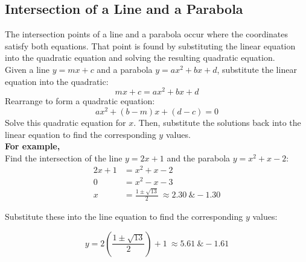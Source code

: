 \documentclass[12pt]{article}
\begin{document}
\begin{center}
\end{center}

\subsection*{Intersection of a Line and a Parabola}
The intersection points of a line and a parabola occur where the coordinates satisfy both equations. That point is found by substituting the linear equation into the quadratic equation and solving the resulting quadratic equation.\\

Given a line \( y = mx + c \) and a parabola \( y = ax^2 + bx + d \), substitute the linear equation into the quadratic:
\[
mx + c = ax^2 + bx + d
\]
Rearrange to form a quadratic equation:
\[
ax^2 + (b-m)x + (d-c) = 0
\]
Solve this quadratic equation for \(x\). Then, substitute the solutions back into the linear equation to find the corresponding \(y\) values.\\

\textbf{For example,}\\

Find the intersection of the line \( y = 2x + 1 \) and the parabola \( y = x^2 + x - 2 \):
\[
\begin{aligned}
2x + 1 &= x^2 + x - 2 \\
0 &= x^2 - x - 3 \\
x &= \frac{1 \pm \sqrt{13}}{2} \ \approx 2.30 \ \& -1.30
\end{aligned}
\]

Substitute these into the line equation to find the corresponding \(y\) values:

$$y = 2(\frac{1\pm\sqrt{13}}{2})+1 \ \approx5.61 \ \& -1.61$$
\end{document}
